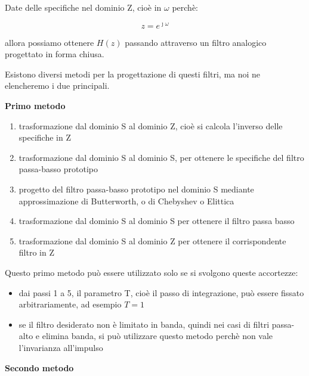 Date delle specifiche nel dominio Z, cioè in $\omega$ perchè: 

{
    \Large 
    \begin{equation}
        z = e^{\jmath \omega}
    \end{equation}
}

allora possiamo ottenere $H \left(z\right)$ passando attraverso un filtro analogico progettato in forma chiusa. \newline 

Esistono diversi metodi per la progettazione di questi filtri, ma noi ne elencheremo i due principali. \newline 

\textbf{Primo metodo} \newline 

\begin{enumerate}
    \item trasformazione dal dominio S al dominio Z, cioè si calcola l'inverso delle specifiche in Z
    \item trasformazione dal dominio S al dominio S, per ottenere le specifiche del filtro passa-basso prototipo 
    \item progetto del filtro passa-basso prototipo nel dominio S mediante approssimazione di Butterworth, o di Chebyshev o Elittica 
    \item trasformazione dal dominio S al dominio S per ottenere il filtro passa basso 
    \item trasformazione dal dominio S al dominio Z per ottenere il corrispondente filtro in Z 
\end{enumerate}

Questo primo metodo può essere utilizzato solo se si svolgono queste accortezze: 

\begin{itemize}
    \item dai passi 1 a 5, il parametro T, cioè il passo di integrazione, può essere fissato arbitrariamente, ad esempio $T = 1$ 
    \item se il filtro desiderato non è limitato in banda, quindi nei casi di filtri passa-alto e elimina banda, si può utilizzare questo metodo perchè non vale l'invarianza all'impulso \newline  
\end{itemize}

\textbf{Secondo metodo} \newline  

